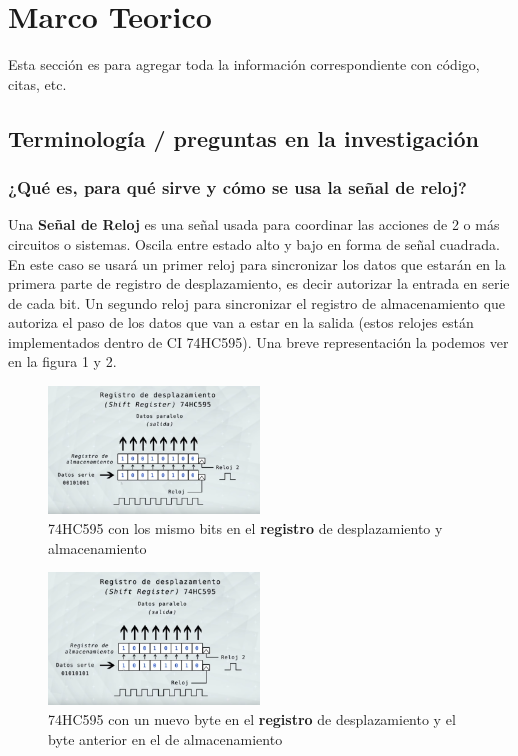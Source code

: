 \documentclass{article}
\begin{document}
\section{Marco Teorico} \label{investigación}
Esta sección es para agregar toda la información correspondiente con código, citas, etc.

\subsection{Terminología / preguntas en la investigación}
\subsubsection*{¿Qué es, para qué sirve y cómo se usa la señal de reloj?}
Una \textbf{Señal de Reloj} \cite{senal_reloj} es una señal usada para coordinar las acciones de 2 o más circuitos o sistemas. Oscila entre estado alto y bajo en forma de señal cuadrada.
\\[0.2cm]
En este caso se usará un primer reloj para sincronizar los datos que estarán en la primera parte de registro de desplazamiento, es decir autorizar la entrada en serie de cada bit. Un segundo reloj para sincronizar el registro de almacenamiento que autoriza el paso de los datos que van a estar en la salida (estos relojes están implementados dentro de CI 74HC595). Una breve representación la podemos ver en la figura 1 y 2.

\begin{figure}[!ht]
\caption{74HC595 con los mismo bits en el \textbf{registro} \cite{registro_desplazamiento_almacenamiento} de desplazamiento y almacenamiento }
\centering
\includegraphics[width=0.5\textwidth]{registro_desplazamiento1.png}
\end{figure}

\begin{figure}[!ht]
\caption{74HC595 con un nuevo byte en el \textbf{registro} \cite{registro_desplazamiento_almacenamiento} de desplazamiento y el byte anterior en el de almacenamiento }
\centering
\includegraphics[width=0.5\textwidth]{registro_desplazamiento2.png}
\end{figure}
\end{document}
